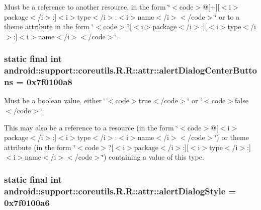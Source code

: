 Must be a reference to another resource, in the form \char`\"{}$<$code$>$@\mbox{[}+\mbox{]}\mbox{[}$<$i$>$package$<$/i$>$:\mbox{]}$<$i$>$type$<$/i$>$:$<$i$>$name$<$/i$>$$<$/code$>$\char`\"{} or to a theme attribute in the form \char`\"{}$<$code$>$?\mbox{[}$<$i$>$package$<$/i$>$:\mbox{]}\mbox{[}$<$i$>$type$<$/i$>$:\mbox{]}$<$i$>$name$<$/i$>$$<$/code$>$\char`\"{}. \hypertarget{classandroid_1_1support_1_1coreutils_1_1_r_1_1attr_8c8ab3e6883120e1fc3aee013419a5e1}{
\subsubsection[{alertDialogCenterButtons}]{\setlength{\rightskip}{0pt plus 5cm}static final int android::support::coreutils.R.R::attr::alertDialogCenterButtons = 0x7f0100a8}}
\label{classandroid_1_1support_1_1coreutils_1_1_r_1_1attr_8c8ab3e6883120e1fc3aee013419a5e1}


Must be a boolean value, either \char`\"{}$<$code$>$true$<$/code$>$\char`\"{} or \char`\"{}$<$code$>$false$<$/code$>$\char`\"{}. 

This may also be a reference to a resource (in the form \char`\"{}$<$code$>$@\mbox{[}$<$i$>$package$<$/i$>$:\mbox{]}$<$i$>$type$<$/i$>$:$<$i$>$name$<$/i$>$$<$/code$>$\char`\"{}) or theme attribute (in the form \char`\"{}$<$code$>$?\mbox{[}$<$i$>$package$<$/i$>$:\mbox{]}\mbox{[}$<$i$>$type$<$/i$>$:\mbox{]}$<$i$>$name$<$/i$>$$<$/code$>$\char`\"{}) containing a value of this type. \hypertarget{classandroid_1_1support_1_1coreutils_1_1_r_1_1attr_6e574d99768459eb69fdfdef7e9c5c37}{
\subsubsection[{alertDialogStyle}]{\setlength{\rightskip}{0pt plus 5cm}static final int android::support::coreutils.R.R::attr::alertDialogStyle = 0x7f0100a6}}
\label{classandroid_1_1support_1_1coreutils_1_1_r_1_1attr_6e574d99768459eb69fdfdef7e9c5c37}


